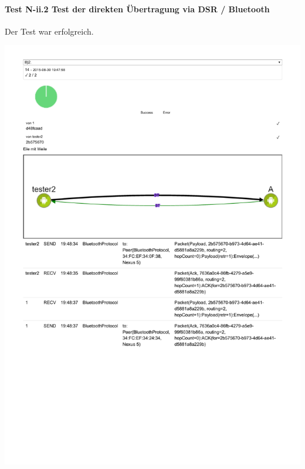 \paragraph{Test N-ii.2 Test der direkten Übertragung via DSR / Bluetooth}

Der Test war erfolgreich.

\includegraphics[trim=0 120 0 0,clip,scale=0.8]{belege/manuelle-tests/netzwerk/Dashboardauszuege/Netzwerktest_II-2a.pdf}
\clearpage
